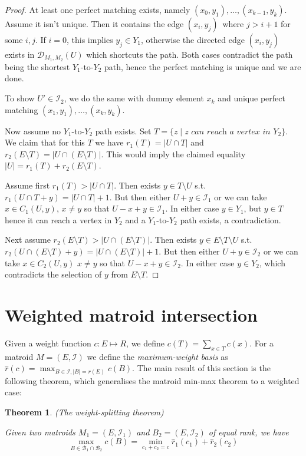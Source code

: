 \documentclass{article}
\newtheorem{theorem}{Theorem}[section]
\begin{document}
\begin{proof}
At least one perfect matching exists, namely $(x_{0}, y_{1}), \dots, (x_{k-1}, y_{k})$. Assume it isn't unique.
Then it contains the edge $(x_{i}, y_{j})$ where $j > i + 1$ for some $i, j$. If $i = 0$, this implies $y_{j} \in Y_{1}$,
otherwise the directed edge $(x_{i}, y_{j})$ exists in $\mathcal{D}_{M_{1}, M_{2}}(U)$ which shortcuts the path. Both
cases contradict the path being the shortest $Y_{1}$-to-$Y_{2}$ path, hence the perfect matching is unique and we are done.

To show $U' \in \mathcal{I}_{2}$, we do the same with dummy element $x_{k}$ and unique perfect matching $(x_{1}, y_{1}), \dots, (x_{k}, y_{k})$.

Now assume no $Y_{1}$-to-$Y_{2}$ path exists. Set $T = \{z \mid z \textit{ can reach a vertex in } Y_{2}\}$. We claim that for this $T$
we have $r_{1}(T) = |U \cap T|$ and $r_{2}(E \setminus T) = |U \cap (E \setminus T)|$. This would imply the claimed equality $|U| = r_{1}(T) + r_{2}(E \setminus T)$.

Assume first $r_{1}(T) > |U \cap T|$. Then exists $y \in T \setminus U$ s.t. $r_{1}(U \cap T + y) = |U \cap T| + 1$. But then either
$U + y \in \mathcal{I}_{1}$ or we can take $x \in C_{1}(U, y)$, $x \neq y$ so that $U - x + y \in \mathcal{I}_{1}$. In either case $y \in Y_{1}$,
but $y \in T$ hence it can reach a vertex in $Y_{2}$ and a $Y_{1}$-to-$Y_{2}$ path exists, a contradiction.

Next assume $r_{2}(E \setminus T) > |U \cap (E \setminus T)|$. Then exists $y \in E \setminus T \setminus U$ s.t. $r_{2}(U \cap (E \setminus T) + y) = |U \cap (E \setminus T)| + 1$.
But then either $U + y \in \mathcal{I}_{2}$ or we can take $x \in C_{2}(U, y)$ $x \neq y$ so that $U - x + y \in \mathcal{I}_{2}$. In either case
$y \in Y_{2}$, which contradicts the selection of $y$ from $E \setminus T$.
\end{proof}

\section{Weighted matroid intersection}
Given a weight function $c : E \mapsto R$, we define $c(T) = \sum_{x \in T} c(x)$.
For a matroid $M = (E, \mathcal{I})$ we define the \textit{maximum-weight basis} as $\hat{r}(c) = \max_{B \in \mathcal{I}, |B| = r(E)} c(B)$.
The main result of this section is the following theorem, which generalises the matroid min-max theorem to a weighted case:
\begin{theorem}
(The weight-splitting theorem)

Given two matroids $M_{1} = (E, \mathcal{I}_{1})$ and $B_{2} = (E, \mathcal{I}_{2})$ of equal rank, we have
\begin{equation*}
\max_{B \in \mathcal{B}_{1} \cap \mathcal{B}_{2}} c(B) = \min_{c_{1} + c_{2} = c} \hat{r}_{1}(c_{1}) + \hat{r}_{2}(c_{2})
\end{equation*}
\end{theorem}
\end{document}
